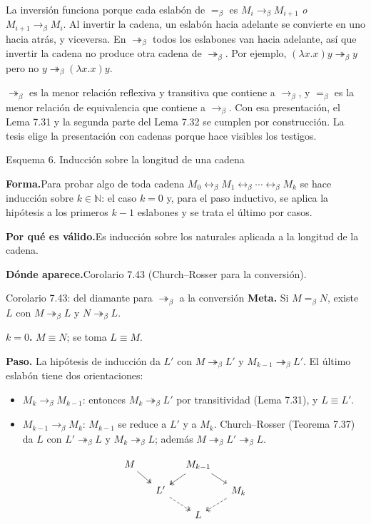 \documentclass[11pt,a4paper]{article}
\newcommand{\forma}{\par\noindent\textbf{Forma.}\enspace}
\newcommand{\porque}{\par\smallskip\noindent\textbf{Por qué es válido.}\enspace}
\newcommand{\donde}{\par\smallskip\noindent\textbf{Dónde aparece.}\enspace}
\newcommand{\bred}{\rightarrow_\beta}
\newcommand{\bmred}{\twoheadrightarrow_\beta}
\newcommand{\beq}{=_\beta}
\newcommand{\bconv}{\leftrightarrow_\beta}
\begin{document}
\begin{nota}[Por qué la simetría solo vale para \(\beq\)]
La inversión funciona porque cada eslabón de \(\beq\) es
\(M_i\bred M_{i+1}\) \emph{o} \(M_{i+1}\bred M_i\). Al invertir la cadena, un
eslabón hacia adelante se convierte en uno hacia atrás, y viceversa. En
\(\bmred\) todos los eslabones van hacia adelante, así que invertir la cadena
no produce otra cadena de \(\bmred\). Por ejemplo,
\((\lambda x.x)y\bmred y\) pero no \(y\bmred(\lambda x.x)y\).
\end{nota}

\begin{nota}
\(\bmred\) es la menor relación reflexiva y transitiva que contiene a
\(\bred\), y \(\beq\) es la menor relación de equivalencia que contiene a
\(\bred\). Con esa presentación, el Lema 7.31 y la segunda parte del
Lema 7.32 se cumplen por construcción. La tesis elige la presentación con
cadenas porque hace visibles los testigos.
\end{nota}

\begin{esquema}{Esquema 6. Inducción sobre la longitud de una cadena}
\forma Para probar algo de toda cadena \(M_0\bconv M_1\bconv\cdots\bconv M_k\)
se hace inducción sobre \(k\in\mathbb N\): el caso \(k=0\) y, para el paso
inductivo, se aplica la hipótesis a los primeros \(k-1\) eslabones y se trata
el último por casos.

\porque Es inducción sobre los naturales aplicada a la longitud de la cadena.

\donde Corolario 7.43 (Church--Rosser para la conversión).
\end{esquema}

\begin{ejemplotesis}{Corolario 7.43: del diamante para \(\bmred\) a la conversión}
\textbf{Meta.} Si \(M\beq N\), existe \(L\) con \(M\bmred L\) y \(N\bmred L\).

\textbf{\(k=0\).} \(M\equiv N\); se toma \(L\equiv M\).

\textbf{Paso.} La hipótesis de inducción da \(L'\) con \(M\bmred L'\) y
\(M_{k-1}\bmred L'\). El último eslabón tiene dos orientaciones:
\begin{itemize}
  \item \(M_k\bred M_{k-1}\): entonces \(M_k\bmred L'\) por transitividad
    (Lema 7.31), y \(L\equiv L'\).
  \item \(M_{k-1}\bred M_k\): \(M_{k-1}\) se reduce a \(L'\) y a \(M_k\).
    Church--Rosser (Teorema 7.37) da \(L\) con \(L'\bmred L\) y
    \(M_k\bmred L\); además \(M\bmred L'\bmred L\).
\end{itemize}
\[
\begin{tikzcd}[column sep=small, row sep=small]
M \arrow[rd, two heads] & & M_{k-1} \arrow[ld, two heads] \arrow[rd] & \\
& L' \arrow[rd, two heads, dashed] & & M_k \arrow[ld, two heads, dashed]\\
& & L &
\end{tikzcd}
\]
\end{ejemplotesis}
\end{document}
